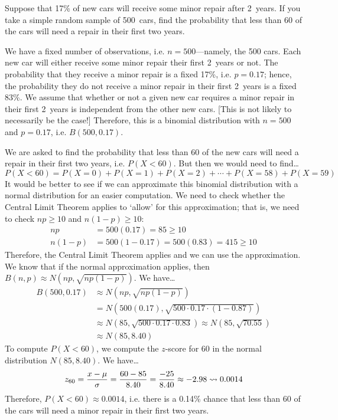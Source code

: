 \documentclass[11pt,letterpaper]{article}
\begin{document}
\newpage



 Suppose that 17\% of new cars will receive some minor repair after 2~years. If you take a simple random sample of 500~cars, find the probability that less than 60 of the cars will need a repair in their first two years. \pspace

\sol We have a fixed number of observations, i.e. $n= 500$---namely, the 500 cars. Each new car will either receive some minor repair their first 2~years or not. The probability that they receive a minor repair is a fixed 17\%, i.e. $p= 0.17$; hence, the probability they do not receive a minor repair in their first 2~years is a fixed 83\%. We assume that whether or not a given new car requires a minor repair in their first 2~years is independent from the other new cars. [This is not likely to necessarily be the case!] Therefore, this is a binomial distribution with $n= 500$ and $p= 0.17$, i.e. $B(500, 0.17)$. \pspace

We are asked to find the probability that less than 60 of the new cars will need a repair in their first two years, i.e. $P(X < 60)$. But then we would need to find\dots
	\[
	P(X < 60)= P(X= 0) + P(X= 1) + P(X= 2) + \cdots + P(X= 58) + P(X= 59) 
	\]
It would be better to see if we can approximate this binomial distribution with a normal distribution for an easier computation. We need to check whether the Central Limit Theorem applies to `allow' for this approximation; that is, we need to check $np \geq 10$ and $n(1 - p) \geq 10$:
	\[
	\begin{aligned}
	np&= 500(0.17)= 85 \geq 10 \\
	n(1 - p)&= 500(1 - 0.17)= 500(0.83)= 415 \geq 10
	\end{aligned}
	\]
Therefore, the Central Limit Theorem applies and we can use the approximation. We know that if the normal approximation applies, then $B(n, p) \approx N \left(np, \sqrt{np (1 - p)} \right)$. We have\dots
	\[
	\begin{aligned}
	B(500, 0.17) &\approx N \left(np, \sqrt{np (1 - p)} \right) \\
	&= N \left(500(0.17), \sqrt{500 \cdot 0.17 \cdot (1 - 0.87)} \right) \\
	&\approx N \left(85, \sqrt{500 \cdot 0.17 \cdot 0.83} \right) \approx N \left(85, \sqrt{70.55} \right) \\
	&\approx N \left(85, 8.40 \right)
	\end{aligned}
	\]
To compute $P(X < 60)$, we compute the $z$-score for 60 in the normal distribution $N(85, 8.40)$. We have\dots
	\[
	z_{60}= \dfrac{x - \mu}{\sigma}= \dfrac{60 - 85}{8.40}= \dfrac{-25}{8.40} \approx -2.98 \rightsquigarrow 0.0014
	\]
Therefore, $P(X < 60) \approx 0.0014$, i.e. there is a 0.14\% chance that less than 60 of the cars will need a minor repair in their first two years. 
\end{document}
